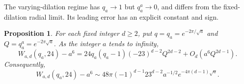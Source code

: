 \documentclass[11pt]{amsart}
\newtheorem{proposition}[theorem]{Proposition}
\theoremstyle{definition}
\theoremstyle{remark}
\numberwithin{equation}{section}
\begin{document}
The varying-dilation regime has $q_a\to1$ but $q_a^a\to0$, and differs from the fixed-dilation radial limit. Its leading error has an explicit constant and sign.

\begin{proposition}\label{CMleading}
For each fixed integer $d\ge2$, put $q=q_a=e^{-2\pi/\sqrt a}$ and
$Q=q_a^a=e^{-2\pi\sqrt a}$. As the integer $a$ tends to infinity,
\begin{equation}\label{CMleadingerror}
 W_{a,d}(q_a,24)-a^6
 =24q_a(q_a-1)(-23)^{d-2}Q^{2d-2}
       +O_d(a^6Q^{2d-1}).
\end{equation}
Consequently,
\begin{equation}\label{CMsigned}
 W_{a,d}(q_a,24)-a^6
 \sim48\pi(-1)^{d-1}23^{d-2}a^{-1/2}
          e^{-4\pi(d-1)\sqrt a}.
\end{equation}
\end{proposition}
\end{document}
